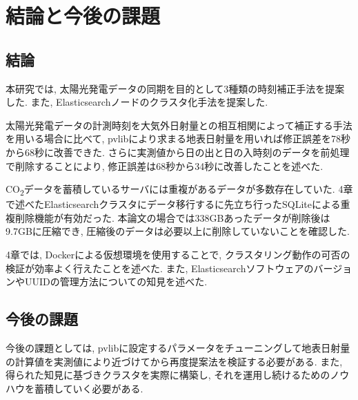 \chapter{結論と今後の課題}
\label{chap:fifth}

\section{結論}
本研究では, 太陽光発電データの同期を目的として3種類の時刻補正手法を提案した. また, Elasticsearchノードのクラスタ化手法を提案した.

太陽光発電データの計測時刻を大気外日射量との相互相関によって補正する手法を用いる場合に比べて, pvlibにより求まる地表日射量を用いれば修正誤差を78秒から68秒に改善できた. さらに実測値から日の出と日の入時刻のデータを前処理で削除することにより, 修正誤差は68秒から34秒に改善したことを述べた. 

CO\textsubscript{2}データを蓄積しているサーバには重複があるデータが多数存在していた. 4章で述べたElasticsearchクラスタにデータ移行するに先立ち行ったSQLiteによる重複削除機能が有効だった. 本論文の場合では338GBあったデータが削除後は9.7GBに圧縮でき, 圧縮後のデータは必要以上に削除していないことを確認した.

4章では, Dockerによる仮想環境を使用することで, クラスタリング動作の可否の検証が効率よく行えたことを述べた. また, ElasticsearchソフトウェアのバージョンやUUIDの管理方法についての知見を述べた.

\section{今後の課題}

今後の課題としては, pvlibに設定するパラメータをチューニングして地表日射量の計算値を実測値により近づけてから再度提案法を検証する必要がある. また, 得られた知見に基づきクラスタを実際に構築し, それを運用し続けるためのノウハウを蓄積していく必要がある.


